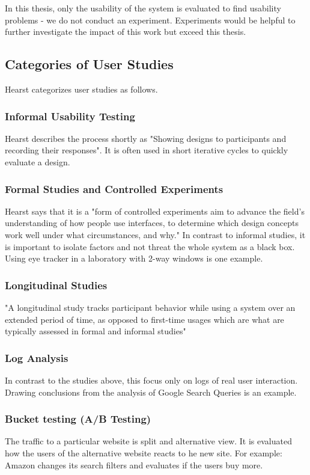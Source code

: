 \documentclass[11pt]{report}
\begin{document}
In this thesis, only the usability of the system is evaluated to find usability problems - we do not conduct an experiment. Experiments would be helpful to further investigate the impact of this work but exceed this thesis.

\subsection{Categories of User Studies}
Hearst \cite{Hearst2009} categorizes user studies as follows.

\subsubsection{Informal Usability Testing}
Hearst \cite{Hearst2009} describes the process shortly as "Showing designs to participants and recording their responses". It is often used in short iterative cycles to quickly evaluate a design.

\subsubsection{Formal Studies and Controlled Experiments}
Hearst \cite{Hearst2009} says that it is a "form of controlled experiments aim to advance the field's understanding of how people use interfaces, to determine which design concepts work well under what circumstances, and why."  In contrast to informal studies, it is important to isolate factors and not threat the whole system as a black box. Using eye tracker in a laboratory with 2-way windows is one example.
	
\subsubsection{Longitudinal Studies}
"A longitudinal study tracks participant behavior while using a system over an extended period of time, as opposed to first-time usages which are what are typically assessed in formal and informal studies"

\subsubsection{Log Analysis}
In contrast to the studies above, this focus only on logs of real user interaction. Drawing conclusions from the analysis of Google Search Queries is an example.

\subsubsection{Bucket testing (A/B Testing)}
The traffic to a particular website is split and alternative view. It is evaluated how the users of the alternative website reacts to he new site. For example: Amazon changes its search filters and evaluates if the users buy more.
\end{document}
